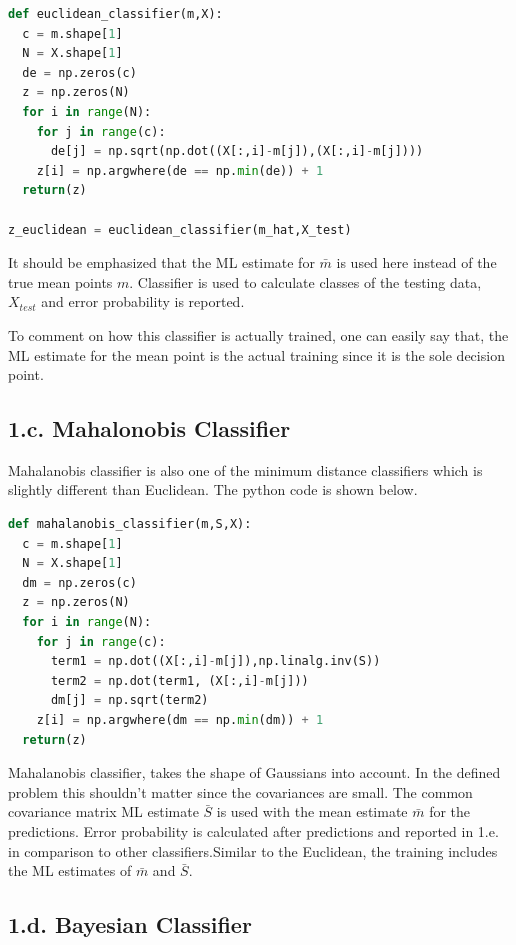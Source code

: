 \documentclass[11pt]{article}
\begin{document}
\begin{lstlisting}[language=Python, caption=Euclidean Classifier]
def euclidean_classifier(m,X):
  c = m.shape[1]
  N = X.shape[1]
  de = np.zeros(c)
  z = np.zeros(N)
  for i in range(N):
    for j in range(c):
      de[j] = np.sqrt(np.dot((X[:,i]-m[j]),(X[:,i]-m[j])))
    z[i] = np.argwhere(de == np.min(de)) + 1
  return(z)
  
z_euclidean = euclidean_classifier(m_hat,X_test)
\end{lstlisting}

It should be emphasized that the ML estimate for $\bar{m}$ is used here instead of the true mean points $m$. Classifier is used to calculate classes of the testing data, $X_{test}$ and error probability is reported.

To comment on how this classifier is actually trained, one can easily say that, the ML estimate for the mean point is the actual training since it is the sole decision point.

\subsection*{1.c. Mahalonobis Classifier}

Mahalanobis classifier is also one of the minimum distance classifiers which is slightly different than Euclidean. The python code is shown below.

\begin{lstlisting}[language=Python, caption=Mahalanobis Classifier]
def mahalanobis_classifier(m,S,X):
  c = m.shape[1]
  N = X.shape[1]
  dm = np.zeros(c)
  z = np.zeros(N)
  for i in range(N):
    for j in range(c):
      term1 = np.dot((X[:,i]-m[j]),np.linalg.inv(S))
      term2 = np.dot(term1, (X[:,i]-m[j]))
      dm[j] = np.sqrt(term2)
    z[i] = np.argwhere(dm == np.min(dm)) + 1
  return(z)
\end{lstlisting}

Mahalanobis classifier, takes the shape of Gaussians into account. In the defined problem this shouldn't matter since the covariances are small. The common covariance matrix ML estimate $\bar{S}$ is used with the mean estimate $\bar{m}$ for the predictions. Error probability is calculated after predictions and reported in 1.e. in comparison to other classifiers.Similar to the Euclidean, the training includes the ML estimates of $\bar{m}$ and $\bar{S}$.

\subsection*{1.d. Bayesian Classifier}
\end{document}
